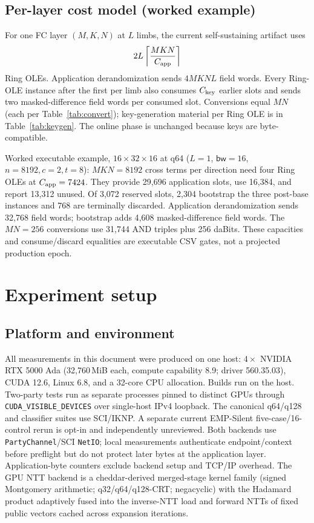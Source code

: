 \documentclass[11pt]{article}
\newcommand{\bw}{\mathsf{bw}}
\begin{document}
\subsection{Per-layer cost model (worked example)}
\label{sec:design-cost}

For one FC layer $(M,K,N)$ at $L$ limbs, the current self-sustaining artifact
uses
\[
2L\left\lceil\frac{MKN}{C_{\rm app}}\right\rceil
\]
Ring OLEs. Application derandomization sends $4MKNL$ field words. Every
Ring-OLE instance after the first per limb also consumes $C_{\rm key}$ earlier
slots and sends two masked-difference field words per consumed slot. Conversions
equal $MN$ (each per Table~\ref{tab:convert}); key-generation material per Ring
OLE is in Table~\ref{tab:keygen}. The online phase is unchanged because keys
are byte-compatible.

Worked executable example, $16{\times}32{\times}16$ at q64 ($L{=}1$,
$\bw{=}16$, $n{=}8192,c{=}2,t{=}8$): $MKN=8192$ cross terms per direction
need four Ring OLEs at $C_{\rm app}=7424$. They provide 29{,}696 application
slots, use 16{,}384, and report 13{,}312 unused. Of 3{,}072 reserved slots,
2{,}304 bootstrap the three post-base instances and 768 are terminally
discarded. Application derandomization sends 32{,}768 field words; bootstrap
adds 4{,}608 masked-difference field words. The $MN=256$ conversions use
31{,}744 AND triples plus 256 daBits. These capacities and consume/discard
equalities are executable CSV gates, not a projected production epoch.

\section{Experiment setup}
\label{sec:experiments}

\subsection{Platform and environment}
\label{sec:platform}

All measurements in this document were produced on one host: $4\times$ NVIDIA
RTX 5000 Ada (32{,}760\,MiB each, compute capability 8.9; driver 560.35.03),
CUDA 12.6, Linux 6.8, and a 32-core CPU allocation. Builds run on the host.
Two-party tests run as separate processes pinned to distinct GPUs through
\texttt{CUDA\_VISIBLE\_DEVICES} over single-host IPv4 loopback. The canonical
q64/q128 and classifier suites use SCI/IKNP. A separate current EMP-Silent
five-case/16-control rerun is opt-in and independently unreviewed. Both
backends use \texttt{PartyChannel}/SCI \texttt{NetIO}; local measurements
authenticate endpoint/context before preflight but do not protect later bytes
at the application layer. Application-byte counters exclude backend setup and
TCP/IP overhead.
The GPU NTT backend is a
cheddar-derived merged-stage kernel family (signed Montgomery arithmetic;
q32/q64/q128-CRT; negacyclic) with the Hadamard product adaptively fused into
the inverse-NTT load and forward NTTs of fixed public vectors cached across
expansion iterations.
\end{document}
